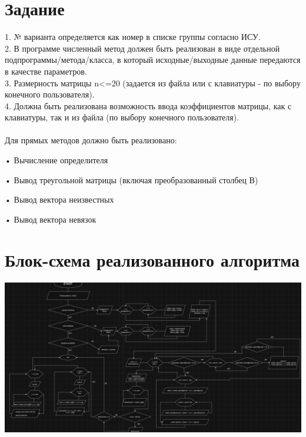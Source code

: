 \documentclass{article}
\begin{document}
\section{Задание}
1. № варианта определяется как номер в списке группы согласно ИСУ.\\
2. В программе численный метод должен быть реализован в виде отдельной подпрограммы/метода/класса, в который исходные/выходные данные передаются в качестве параметров.\\
3. Размерность матрицы n<=20 (задается из файла или с клавиатуры - по выбору конечного пользователя).\\
4. Должна быть реализована возможность ввода коэффициентов матрицы, как с клавиатуры, так и из файла (по выбору конечного пользователя).\\
\\
Для прямых методов должно быть реализовано:

• Вычисление определителя

• Вывод треугольной матрицы (включая преобразованный столбец В)

• Вывод вектора неизвестных

• Вывод вектора невязок
\section{Блок-схема реализованного алгоритма}
\includegraphics[width=1\textwidth]{2}
\end{document}
